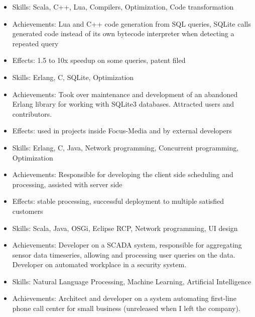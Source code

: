 \documentclass[12pt,a4paper,sans]{moderncv}        %
\begin{document}
\begin{itemize}
  \item Skills: Scala, C++, Lua, Compilers, Optimization, Code transformation
  \item Achievements: Lua and C++ code generation from SQL queries, SQLite calls generated code instead of its own bytecode interpreter when detecting a repeated query
  \item Effects: 1.5 to 10x speedup on some queries, patent filed
\end{itemize}

\begin{itemize}
  \item Skills: Erlang, C, SQLite, Optimization
  \item Achievements: Took over maintenance and development of an abandoned Erlang library for working with SQLite3 databases.
  Attracted users and contributors.
  \item Effects: used in projects inside Focus-Media and by external developers
\end{itemize}

\begin{itemize}
  \item Skills: Erlang, C, Java, Network programming, Concurrent programming, Optimization
  \item Achievements: Responsible for developing the client side scheduling and processing, assisted with server side
  \item Effects: stable processing, successful deployment to multiple satisfied customers
\end{itemize}

\begin{itemize}
  \item Skills: Scala, Java, OSGi, Eclipse RCP, Network programming, UI design
  \item Achievements: Developer on a SCADA system, responsible for aggregating sensor data timeseries, allowing and processing user queries on the data. Developer on automated workplace in a security system.
\end{itemize}

\begin{itemize}
  \item Skills: Natural Language Processing, Machine Learning, Artificial Intelligence
  \item Achievements: Architect and developer on a system automating first-line phone call center for small business (unreleased when I left the company).
\end{itemize}
\end{document}
